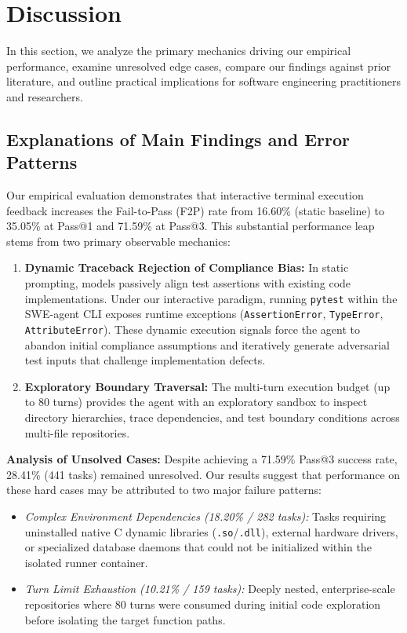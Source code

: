\section{Discussion}
\label{sec:discussion}

In this section, we analyze the primary mechanics driving our empirical performance, examine unresolved edge cases, compare our findings against prior literature, and outline practical implications for software engineering practitioners and researchers.

\subsection{Explanations of Main Findings and Error Patterns}
Our empirical evaluation demonstrates that interactive terminal execution feedback increases the Fail-to-Pass (F2P) rate from 16.60\% (static baseline) to 35.05\% at Pass@1 and 71.59\% at Pass@3. This substantial performance leap stems from two primary observable mechanics:

\begin{enumerate}
    \item \textbf{Dynamic Traceback Rejection of Compliance Bias:} In static prompting, models passively align test assertions with existing code implementations. Under our interactive paradigm, running \texttt{pytest} within the SWE-agent CLI exposes runtime exceptions (\texttt{AssertionError}, \texttt{TypeError}, \texttt{AttributeError}). These dynamic execution signals force the agent to abandon initial compliance assumptions and iteratively generate adversarial test inputs that challenge implementation defects.
    \item \textbf{Exploratory Boundary Traversal:} The multi-turn execution budget (up to 80 turns) provides the agent with an exploratory sandbox to inspect directory hierarchies, trace dependencies, and test boundary conditions across multi-file repositories.
\end{enumerate}

\textbf{Analysis of Unsolved Cases:} Despite achieving a 71.59\% Pass@3 success rate, 28.41\% (441 tasks) remained unresolved. Our results suggest that performance on these hard cases may be attributed to two major failure patterns:
\begin{itemize}
    \item \textit{Complex Environment Dependencies (18.20\% / 282 tasks):} Tasks requiring uninstalled native C dynamic libraries (\texttt{.so}/\texttt{.dll}), external hardware drivers, or specialized database daemons that could not be initialized within the isolated runner container.
    \item \textit{Turn Limit Exhaustion (10.21\% / 159 tasks):} Deeply nested, enterprise-scale repositories where 80 turns were consumed during initial code exploration before isolating the target function paths.
\end{itemize}

